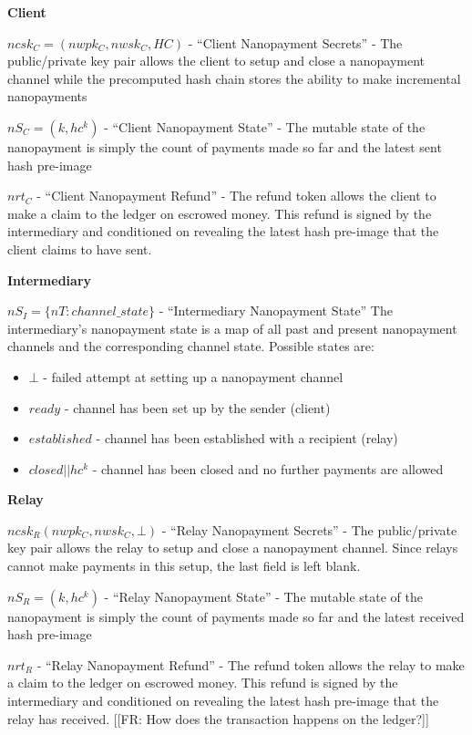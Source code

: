 \documentclass{article}
\newcommand{\flo}[1]{ {\color{blue} [[FR: #1]]}}
\begin{document}
\textbf{Client}

$ncsk_C = (nwpk_C, nwsk_C, HC)$ - ``Client Nanopayment Secrets'' - The public/private key pair allows the client to setup and close a nanopayment channel while the precomputed hash chain stores the ability to make incremental nanopayments

$nS_C = (k, hc^k)$ - ``Client Nanopayment State'' - The mutable state of the nanopayment is simply the count of payments made so far and the latest sent hash pre-image

$nrt_C$ - ``Client Nanopayment Refund'' - The refund token allows the client to make a claim to the ledger on escrowed money. This refund is signed by the intermediary and conditioned on revealing the latest hash pre-image that the client claims to have sent.

\textbf{Intermediary}

$nS_I = \{nT: channel\_state\}$ - ``Intermediary Nanopayment State'' The intermediary's nanopayment state is a map of all past and present nanopayment channels and the corresponding channel state. Possible states are:
\begin{itemize}
\item $\bot$ - failed attempt at setting up a nanopayment channel
\item $ready$ - channel has been set up by the sender (client)
\item $established$ - channel has been established with a recipient (relay)
\item $closed||hc^k$ - channel has been closed and no further payments are allowed
\end{itemize}

\textbf{Relay}

$ncsk_R (nwpk_C, nwsk_C, \bot)$ - ``Relay Nanopayment Secrets'' - The public/private key pair allows the relay to setup and close a nanopayment channel. Since relays cannot make payments in this setup, the last field is left blank.

$nS_R = (k, hc^k)$ - ``Relay Nanopayment State'' - The mutable state of the nanopayment is simply the count of payments made so far and the latest received hash pre-image

$nrt_R$ - ``Relay Nanopayment Refund'' - The refund token allows the relay to make a claim to the ledger on escrowed money. This refund is signed by the intermediary and conditioned on revealing the latest hash pre-image that the relay has received.
\flo{How does the transaction happens on the ledger?}
\end{document}

